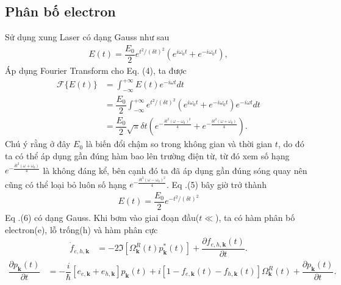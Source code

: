 \documentclass{article}
\newcommand{\f}[2]{\dfrac{#1}{#2}}
\begin{document}
\subsection{Phân bố electron}
Sử dụng xung Laser có dạng Gauss như sau
\begin{gather}
	E(t) = \f{E_{0}}{2} e^{t^{2} / (\delta t)^{2}} (e^{i\omega_{0} t} + e^{-i\omega_{0} t}),
\end{gather}
Áp dụng Fourier Transform cho Eq. (4), ta được
\begin{equation}
	\begin{aligned}
		\mathcal{F}\{ E(t) \}
		 & = \int_{-\infty}^{+\infty} E(t) e^{-i \omega t} dt                                                                                                     \\
		 & = \f{E_{0}}{2} \int_{-\infty}^{+\infty}  e^{t^{2} / (\delta t)^{2}} (e^{i\omega_{0} t} + e^{-i\omega_{0} t} ) e^{-i \omega t} dt                       \\
		 & = \f{E_{0}}{2} \sqrt{\pi} \delta t ( e^{- \frac{\delta t^{2} (\omega - \omega_{0})^{2} }{4}} + e^{- \frac{\delta {t}^{2} (\omega + \omega_{0})}{4}} ).
	\end{aligned}
\end{equation}
Chú ý rằng ở đây $E_{0}$ là biến đổi chậm so trong không gian và thời gian $t$, do đó ta có thể áp dụng gần đúng hàm bao lên trường điện từ, từ đó xem số hạng $e^{- \frac{\delta {t}^{2} (\omega + \omega_{0})}{4}}$ là không đáng kể, bên cạnh đó ta đã áp dụng gần đúng sóng quay nên cũng có thể loại bỏ luôn số hạng $e^{- \frac{\delta t^{2} (\omega - \omega_{0})^{2} }{4}}$. Eq .(5) bây giờ trở thành
\begin{gather}
	E(t) = \f{E_{0}}{2} e^{-t^{2} / (\delta t)^{2}}
\end{gather}
Eq .(6) có dạng Gauss. Khi bơm vào giai đoạn đầu($t\ll$), ta có hàm phân bố electron(e), lỗ trống(h) và hàm phân cực
\begin{equation}
	\begin{aligned}
		\dot{f}_{e,h,\mathbf{k}} 
		&= -2 \Im\left[ \Omega_{\mathbf{k}}^{R}(t) p_{\mathbf{k}}^{*}(t) \right] + \f{\partial f_{e,h,\mathbf{k}}(t)}{\partial t}.
	\end{aligned}
\end{equation}
\begin{equation}
	\begin{aligned}
		\f{\partial p_{\mathbf{k}}(t)}{\partial t}
		&= -\f{i}{\hbar} \left[ e_{e,\mathbf{k}} + e_{h,\mathbf{k}}\right] p_{\mathbf{k}}(t) + i \left[ 1 - f_{e,\mathbf{k}}(t) - f_{h,\mathbf{k}}(t)  \right] \Omega_{\mathbf{k}}^{R}(t) + \f{\partial p_{\mathbf{k}}(t)}{\partial t}.
	\end{aligned}
\end{equation}
\end{document}
